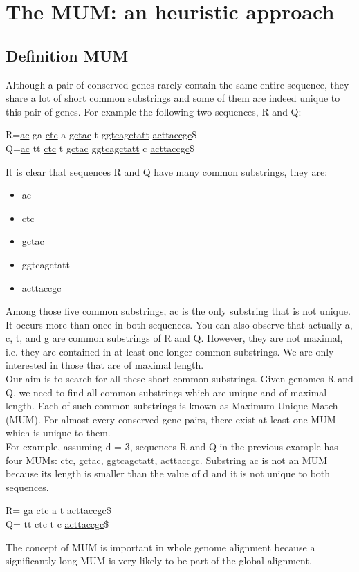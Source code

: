 \documentclass[3p,times]{elsarticle}
\begin{document}
\section{The MUM: an heuristic approach}
\subsection{Definition MUM}
Although a pair of conserved genes rarely contain the same entire sequence, they share a lot of short common substrings and some of them are indeed unique to this pair of genes. For example the following two sequences, R and Q:\\
\begin{center}
    R=\underline{ac} ga \underline{ctc} a \underline{gctac} t \underline{ggtcagctatt} \underline{acttaccgc}\$\\
      Q=\underline{ac} tt \underline{ctc} t \underline{gctac} \underline{ggtcagctatt} c \underline{acttaccgc}\$\\
    \end{center}
    It is clear that sequences R and Q have many common substrings, they are:
    \begin{itemize}
      \item ac
      \item ctc
      \item gctac
      \item ggtcagctatt
      \item acttaccgc
    \end{itemize}
Among those five common substrings, ac is the only substring that is not unique. It occurs more than once in both sequences. You can also observe that actually a, c, t, and g are common substrings of R and Q. However, they are not maximal, i.e. they are contained in at least one longer common substrings. We are only interested in those that are of maximal length.\\
Our aim is to search for all these short common substrings. Given genomes R and Q, we need to find all common substrings which are unique and of maximal length. Each of such common substrings is known as Maximum Unique Match (MUM). For almost every conserved gene pairs, there exist at least one MUM which is unique to them.\\
For example, assuming d = 3, sequences R and Q in the previous example has four MUMs: ctc, gctac, ggtcagctatt, acttaccgc. Substring ac is not an MUM because its length is smaller than the value of d and it is not unique to both sequences.
\begin{center}
    R= ga \sout{ctc} a  t  \uline{acttaccgc}\$\\
      Q= tt \sout{ctc} t   c \uline{acttaccgc}\$\\
    \end{center}
The concept of MUM is important in whole genome alignment because a significantly long MUM is very likely to be part of the global alignment.
\end{document}
